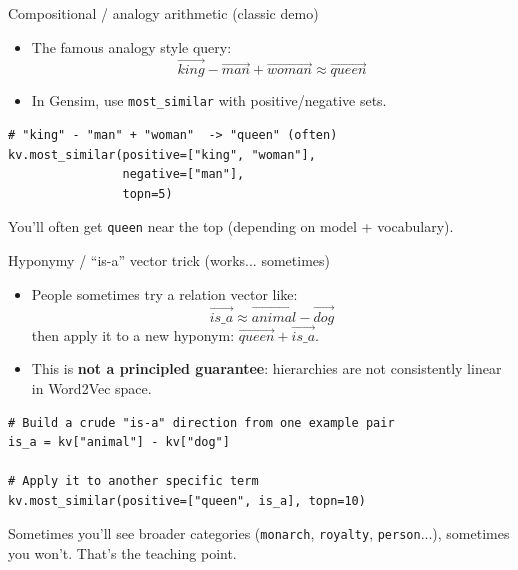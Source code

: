 \documentclass[aspectratio=169]{beamer}
\begin{document}
\begin{frame}[fragile]{Compositional / analogy arithmetic (classic demo)}
\begin{itemize}
  \item The famous analogy style query:
  \[
    \vec{king} - \vec{man} + \vec{woman} \approx \vec{queen}
  \]
  \item In Gensim, use \texttt{most\_similar} with positive/negative sets.
\end{itemize}

\begin{verbatim}
# "king" - "man" + "woman"  -> "queen" (often)
kv.most_similar(positive=["king", "woman"],
                negative=["man"],
                topn=5)
\end{verbatim}

\small
You’ll often get \texttt{queen} near the top (depending on model + vocabulary).
\end{frame}

\begin{frame}[fragile]{Hyponymy / “is-a” vector trick (works... sometimes)}
\begin{itemize}
  \item People sometimes try a relation vector like:
  \[
    \vec{is\_a} \approx \vec{animal} - \vec{dog}
  \]
  then apply it to a new hyponym: \(\vec{queen} + \vec{is\_a}\).
  \item This is \textbf{not a principled guarantee}: hierarchies are not consistently linear in Word2Vec space.
\end{itemize}

\begin{verbatim}
# Build a crude "is-a" direction from one example pair
is_a = kv["animal"] - kv["dog"]

# Apply it to another specific term
kv.most_similar(positive=["queen", is_a], topn=10)
\end{verbatim}

\small
Sometimes you’ll see broader categories (\texttt{monarch}, \texttt{royalty}, \texttt{person}...), sometimes you won’t.
That’s the teaching point.
\end{frame}
\end{document}
